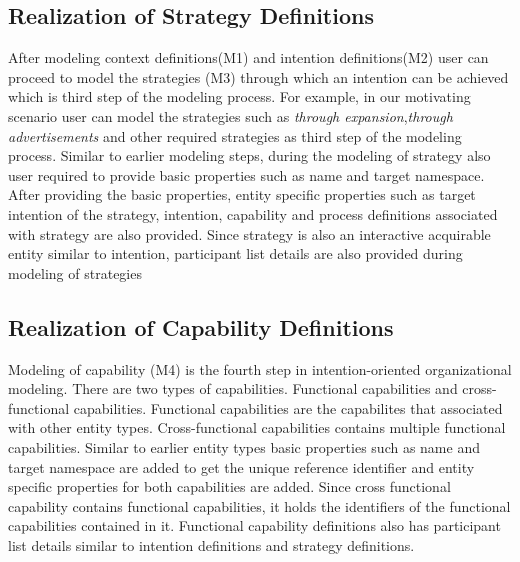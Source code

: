 \subsection{Realization of Strategy Definitions}
After modeling context definitions(M1) and intention definitions(M2) user can proceed to model the strategies (M3) through which an intention can be achieved which is third step of the modeling process. For example, in our motivating scenario user can model the strategies such as \textit{through expansion},\textit{through advertisements} and other required strategies as third step of the modeling process. Similar to earlier modeling steps, during the modeling of strategy also user required to provide basic properties such as name and target namespace. After providing the basic properties, entity specific properties such as target intention of the strategy, intention, capability and process definitions associated with strategy are also provided. Since strategy is also an interactive acquirable entity similar to intention, participant list details are also provided during modeling of strategies

\subsection{Realization of Capability Definitions}
Modeling of capability (M4) is the fourth step in intention-oriented organizational modeling. There are two types of capabilities. Functional capabilities and cross-functional capabilities. Functional capabilities are the capabilites that associated with other entity types. Cross-functional capabilities contains multiple functional capabilities. Similar to earlier entity types basic properties such as name and target namespace are added to get the unique reference identifier and entity specific properties for both capabilities are added. Since cross functional capability contains functional capabilities, it holds the identifiers of the functional capabilities contained in it. Functional capability definitions also has participant list details similar to intention definitions and strategy definitions. 

